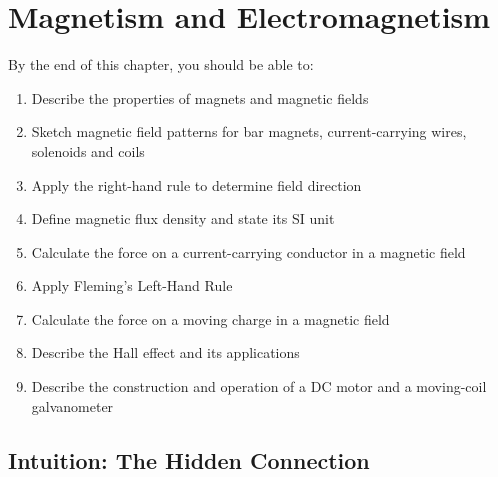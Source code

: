 %

\chapter{Magnetism and Electromagnetism}
\label{ch:magnetism}
\minitoc
\newpage


\begin{objectivebox}
By the end of this chapter, you should be able to:
\begin{enumerate}[noitemsep]
  \item Describe the properties of magnets and
  magnetic fields
  \item Sketch magnetic field patterns for bar magnets,
  current-carrying wires, solenoids and coils
  \item Apply the right-hand rule to determine field
  direction
  \item Define magnetic flux density and state its
  SI unit
  \item Calculate the force on a current-carrying
  conductor in a magnetic field
  \item Apply Fleming's Left-Hand Rule
  \item Calculate the force on a moving charge in
  a magnetic field
  \item Describe the Hall effect and its applications
  \item Describe the construction and operation of
  a DC motor and a moving-coil galvanometer
\end{enumerate}
\end{objectivebox}

\section{Intuition: The Hidden Connection}

